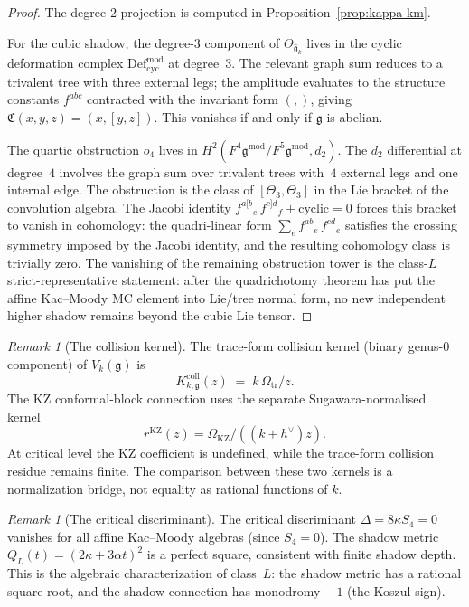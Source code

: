 \documentclass[11pt]{article}
\theoremstyle{plain}
\theoremstyle{definition}
\theoremstyle{remark}
\newtheorem{remark}[theorem]{Remark}
\newcommand{\fg}{\mathfrak{g}}
\newcommand{\ghat}{\widehat{\fg}}
\numberwithin{equation}{section}
\begin{document}
\begin{proof}
The degree-$2$ projection is computed in
Proposition~\ref{prop:kappa-km}.

For the cubic shadow, the degree-$3$ component of
$\Theta_{\ghat_k}$ lives in the cyclic deformation complex
$\mathrm{Def}_{\mathrm{cyc}}^{\mathrm{mod}}$ at degree~$3$.
The relevant graph sum reduces to a trivalent tree with
three external legs; the amplitude evaluates to the
structure constants $f^{abc}$ contracted with the
invariant form $(,)$, giving
$\mathfrak{C}(x,y,z) = (x,[y,z])$.
This vanishes if and only if $\fg$ is abelian.

The quartic obstruction $o_4$ lives in
$H^2(F^4\fg^{\mathrm{mod}}/F^5\fg^{\mathrm{mod}}, d_2)$.
The $d_2$ differential at degree~$4$ involves the graph
sum over trivalent trees with~$4$ external legs and one
internal edge. The obstruction is the class of
$[\Theta_3, \Theta_3]$ in the Lie bracket of the
convolution algebra.
The Jacobi identity
$f^{a[b}{}_e\, f^{c]d}{}_f + \text{cyclic} = 0$
forces this bracket to vanish in cohomology:
the quadri-linear form
$\sum_{e} f^{ab}{}_e\, f^{cd}{}_e$
satisfies the crossing symmetry
imposed by the Jacobi identity, and the resulting
cohomology class is trivially zero.
The vanishing of the remaining obstruction tower is the class-\(L\)
strict-representative statement: after the quadrichotomy theorem has
put the affine Kac--Moody MC element into Lie/tree normal form, no
new independent higher shadow remains beyond the cubic Lie tensor.
\end{proof}

\begin{remark}[The collision kernel]\label{rem:r-matrix}
The trace-form collision kernel (binary genus-$0$ component)
of \(V_k(\fg)\) is
\begin{equation}\label{eq:km-rmatrix}
K_{k,\fg}^{\mathrm{coll}}(z) \;=\; k\,\Omega_{\mathrm{tr}}/z.
\end{equation}
The KZ conformal-block connection uses the separate Sugawara-normalised
kernel
\[
r^{\mathrm{KZ}}(z)=\Omega_{\mathrm{KZ}}/((k+h^\vee)z).
\]
At critical level the KZ coefficient is undefined, while the
trace-form collision residue remains finite. The comparison between
these two kernels is a normalization bridge, not equality as rational
functions of \(k\).
\end{remark}

\begin{remark}[The critical discriminant]
\label{rem:discriminant}
The critical discriminant
$\Delta = 8\kappa S_4 = 0$ vanishes for all affine
Kac--Moody algebras (since $S_4 = 0$).
The shadow metric $Q_L(t) = (2\kappa + 3\alpha t)^2$
is a perfect square, consistent with finite shadow
depth. This is the algebraic characterization of
class~$L$: the shadow metric has a rational square root,
and the shadow connection has monodromy~$-1$ (the
Koszul sign).
\end{remark}
\end{document}
